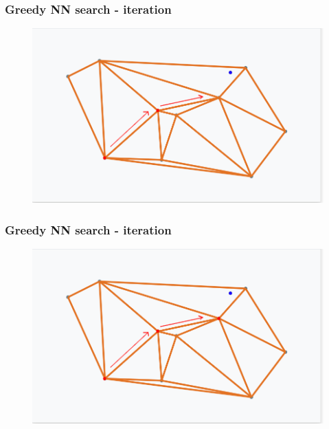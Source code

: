 \documentclass{beamer}
\begin{document}
  \begin{frame}
    \frametitle{Greedy NN search - iteration}  
  \begin{figure}[greedy_search_start_new_step_2_1]
    \vspace*{-0.1cm}
  	\includegraphics[scale=0.3]{greedy_search_start_new_step_2_1} 	
  \end{figure} 
  \end{frame}       
  
  \begin{frame}
    \frametitle{Greedy NN search - iteration}  
  \begin{figure}[greedy_search_start_new_step_2_2]
    \vspace*{-0.1cm}
  	\includegraphics[scale=0.3]{greedy_search_start_new_step_2_2} 	
  \end{figure} 
  \end{frame}         
\end{document}
